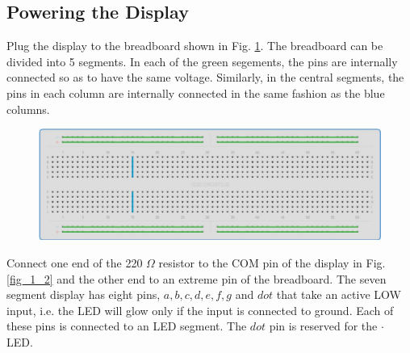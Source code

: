 \subsection{Powering the Display}
\begin{figure}
\onecolumn
\setcounter{problem}{6}  

%
\setcounter{problem}{0}  
\twocolumn
\end{figure}

%
\begin{problem}
	Plug the display to the breadboard shown in Fig. \ref{fig_1_1}. The breadboard can be divided into 5 segments.  In each of the green segements, the pins are internally connected so as to have the same voltage.  Similarly, in the central segments, the pins in each column  are internally connected in the same fashion as the blue columns. 
%
\end{problem}
%
\begin{figure}[!ht]
\begin{center}
\includegraphics[width=\columnwidth]{./chapter1/figs/breadboard}
\end{center}
\label{fig_1_1}	
\end{figure}
%
\begin{problem}
	Connect one end of the 220 $\Omega$ resistor to the COM pin of the display in Fig. \ref{fig_1_2} and the other end to an extreme pin of the breadboard.	The seven segment display has eight pins, $a, b, c, d, e, f, g$ and $dot$ that take an active LOW input, i.e.  the LED will glow only if the input is connected to ground.  Each of these pins is connected to an LED segment.  The $dot$ pin is  reserved for the $\cdot$ LED.  
%
\end{problem}
%
